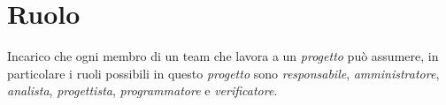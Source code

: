 \section{Ruolo}
Incarico che ogni membro di un team che lavora a un \emph{progetto} può assumere, in particolare i ruoli possibili in questo \emph{progetto} sono \emph{responsabile}, \emph{amministratore}, \emph{analista}, \emph{progettista}, \emph{programmatore} e \emph{verificatore}.